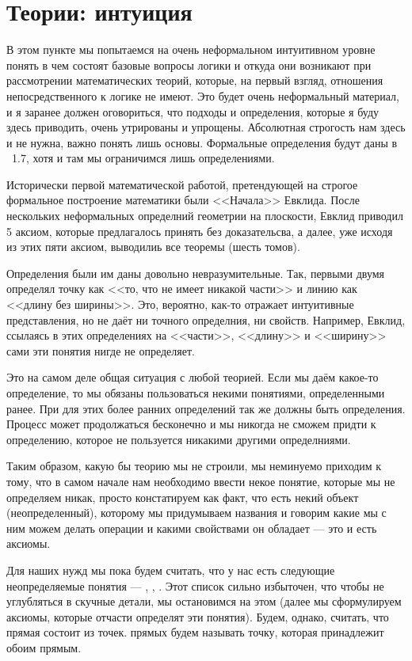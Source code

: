 \section{Теории: интуиция}

В этом пункте мы попытаемся на очень неформальном интуитивном уровне понять в чем состоят базовые вопросы логики и откуда они возникают при рассмотрении математических теорий, которые, на первый взгляд, отношения непосредственного к логике не имеют. Это будет очень неформальный материал, и я заранее должен оговориться, что подходы и определения, которые я буду здесь приводить, очень утрированы и упрощены. Абсолютная строгость нам здесь и не нужна, важно понять лишь основы. Формальные определения будут даны в \textsection~1.7, хотя и там мы ограничимся лишь определениями.

Исторически первой математической работой, претендующей на строгое формальное построение математики были <<Начала>> Евклида. После нескольких неформальных определний геометрии на плоскости, Евклид приводил 5 аксиом, которые предлагалось принять без доказательсва, а далее, уже исходя из этих пяти аксиом, выводилиь все теоремы (шесть томов).

Определения были им даны довольно невразумительные. Так, первыми двумя определял точку как <<то, что не имеет никакой части>> и линию как <<длину без ширины>>. Это, вероятно, как-то отражает интуитивные представления, но не даёт ни точного определния, ни свойств. Например, Евклид, ссылаясь в этих определениях на <<части>>, <<длину>> и <<ширину>> сами эти понятия нигде не определяет.

Это на самом деле общая ситуация с любой теорией. Если мы даём какое-то определение, то мы обязаны пользоваться некими понятиями, определенными ранее. При для этих более ранних определений так же должны быть определения. Процесс может продолжаться бесконечно и мы никогда не сможем придти к определению, которое не пользуется никакими другими определниями.

Таким образом, какую бы теорию мы не строили, мы неминуемо приходим к тому, что в самом начале нам необходимо ввести некое понятие, которые мы не определяем никак, просто констатируем как факт, что есть некий объект (неопределенный), которому мы придумываем названия и говорим какие мы с ним можем делать операции и какими свойствами он обладает --- это и есть аксиомы.

Для наших нужд мы пока будем считать, что у нас есть следующие неопределяемые понятия --- , , . Этот список сильно избыточен, что чтобы не углубляться в скучные детали, мы остановимся на этом (далее мы сформулируем аксиомы, которые отчасти определят эти понятия). Будем, однако, считать, что прямая состоит из точек.  прямых будем называть точку, которая принадлежит обоим прямым.

